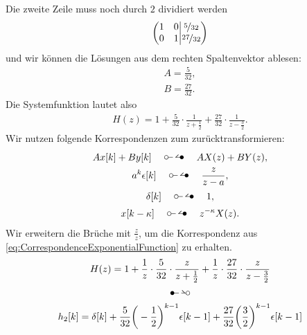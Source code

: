 \documentclass[11pt,a4paper,DIV=12]{scrartcl}
\begin{document}
%
%
%
Die zweite Zeile muss noch durch $2$ dividiert werden
%
%
%
\begin{gather}
	\left\lparen
	\begin{matrix}
		1 & 0 \\
		0&1
	\end{matrix}
	\middle\vert
	\begin{matrix}
		\nicefrac{5}{32} \\
		\nicefrac{27}{32}
	\end{matrix}
	\right\rparen
\end{gather}
%
%
und wir können die Lösungen aus dem rechten Spaltenvektor ablesen:
%
%
\begin{gather}
	A=\frac{5}{32},\\
	B=\frac{27}{32}.
\end{gather}
%
Die Systemfunktion lautet also
%
\begin{gather}
	H(z)=1+\frac{5}{32}\cdot\frac{1}{z+\frac{1}{2}}+\frac{27}{32}\cdot\frac{1}{z-\frac{3}{2}}.
\end{gather}
%
Wir nutzen folgende Korrespondenzen zum zurücktransformieren:
%
\begin{gather}
	Ax[k]+By[k]\quad \ztransf\quad AX(z)+BY(z),\\
	\label{eq:CorrespondenceExponentialFunction}
	a^k\epsilon[k]\quad\ztransf\quad \frac{z}{z-a},\\
	\delta[k]\quad\ztransf\quad 1,\\
	x[k-\kappa]\quad\ztransf\quad z^{-\kappa}X(z).
\end{gather}
%
Wir erweitern die Brüche mit $\frac{z}{z}$, um die Korrespondenz aus \eqref{eq:CorrespondenceExponentialFunction} zu erhalten.
%
%
\begin{gather}
	H(z)=1+ \frac{1}{z}\cdot\frac{5}{32}\cdot\frac{z}{z+\frac{1}{2}}+\frac{1}{z}\cdot\frac{27}{32}\cdot\frac{z}{z-\frac{3}{2}}\nonumber\\
	\Ztransf\nonumber\\
	h_2[k]=\delta[k]+\frac{5}{32}\bigg (-\frac{1}{2}\bigg )^{k-1}\epsilon[k-1]+\frac{27}{32}\bigg (\frac{3}{2}\bigg )^{k-1}\epsilon[k-1]\nonumber
\end{gather}
%
%
\newpage
\end{document}
